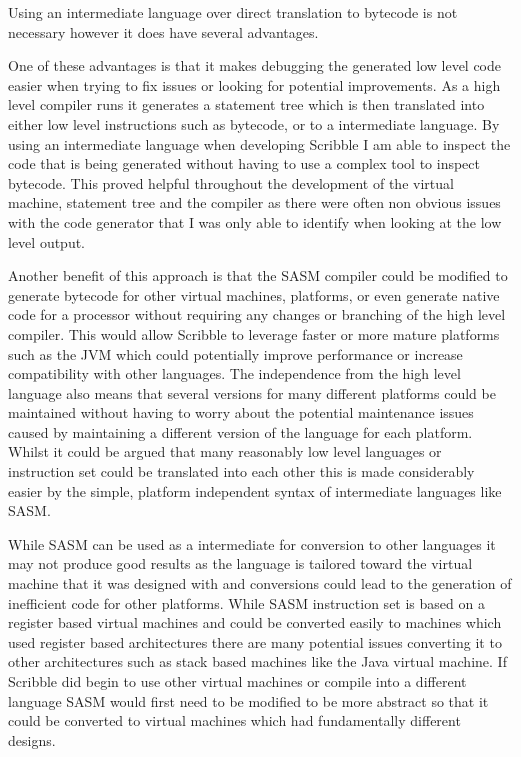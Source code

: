 \documentclass[]{final_report}
\begin{document}
Using an intermediate language over direct translation to bytecode is not necessary however it does have several advantages.

One of these advantages is that it makes debugging the generated low level code easier when trying to fix issues or looking for potential improvements. As a high level compiler runs it generates a statement tree which is then translated into either low level instructions such as bytecode, or to a intermediate language. By using an intermediate language when developing Scribble I am able to inspect the code that is being generated without having to use a complex tool to inspect bytecode. This proved helpful throughout the development of the virtual machine, statement tree and the compiler as there were often non obvious issues with the code generator that I was only able to identify when looking at the low level output.

Another benefit of this approach is that the SASM compiler could be modified to generate bytecode for other virtual machines, platforms, or even generate native code for a processor without requiring any changes or branching of the high level compiler. This would allow Scribble to leverage faster or more mature platforms such as the JVM which could potentially improve performance or increase compatibility with other languages. The independence from the high level language also means that several versions for many different platforms could be maintained without having to worry about the potential maintenance issues caused by maintaining a different version of the language for each platform. Whilst it could be argued that many reasonably low level languages or instruction set could be translated into each other this is made considerably easier by the simple, platform independent syntax of intermediate languages like SASM.

While SASM can be used as a intermediate for conversion to other languages it may not produce good results as the language is tailored toward the virtual machine that it was designed with and conversions could lead to the generation of inefficient code for other platforms. While SASM instruction set is based on a register based virtual machines and could be converted easily to machines which used register based architectures there are many potential issues converting it to other architectures such as stack based machines like the Java virtual machine. If Scribble did begin to use other virtual machines or compile into a different language SASM would first need to be modified to be more abstract so that it could be converted to virtual machines which had fundamentally different designs.
\end{document}
